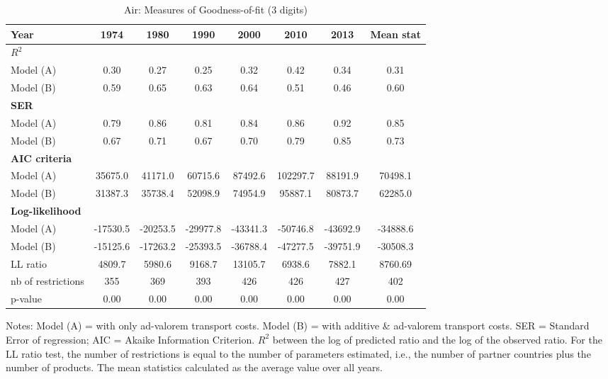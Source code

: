 \documentclass[a4paper,11pt]{article}
\begin{document}
\begin{table}[htbp]
  \centering
  \caption{Air: Measures of Goodness-of-fit (3 digits)}
  \footnotesize{
\begin{center}
    \begin{tabular}{l|cccccc|c}
    \hline \hline
    Year  & 1974  & 1980  & 1990  & 2000  & \multicolumn{1}{c}{2010} & \multicolumn{1}{c}{2013} & Mean stat \\ \hline
    \multicolumn{8}{l}{\bf{$R^2$} }\\ \hline
    Model (A)& 0.30  & 0.27  & 0.25  & 0.32  & \multicolumn{1}{c}{0.42} & \multicolumn{1}{c}{0.34} & 0.31 \\
    Model (B) & 0.59  & 0.65  & 0.63  & 0.64  & \multicolumn{1}{c}{0.51} & \multicolumn{1}{c}{0.46} & 0.60 \\ \hline
    \multicolumn{8}{l}{\textbf{SER}  }  \\ \hline
     Model (A) & 0.79  & 0.86  & 0.81  & 0.84  & \multicolumn{1}{c}{0.86} & \multicolumn{1}{c}{0.92} & 0.85 \\
    Model (B) & 0.67  & 0.71  & 0.67  & 0.70  & \multicolumn{1}{c}{0.79} & \multicolumn{1}{c}{0.85} & 0.73 \\ \hline
   \multicolumn{8}{l}{\textbf{AIC criteria}}  \\ \hline
    Model (A) & 35675.0 & 41171.0 & 60715.6 & 87492.6 & \multicolumn{1}{c}{102297.7} & \multicolumn{1}{c}{88191.9} & 70498.1 \\
    Model (B)  & 31387.3 & 35738.4 & 52098.9 & 74954.9 & \multicolumn{1}{c}{95887.1} & \multicolumn{1}{c}{80873.7} & 62285.0 \\ \hline
    \multicolumn{8}{l}{\textbf{Log-likelihood}} \\ \hline
    Model (A) & -17530.5 & -20253.5 & -29977.8 & -43341.3 & \multicolumn{1}{c}{-50746.8} & \multicolumn{1}{c}{-43692.9} & -34888.6 \\
    Model (B) & -15125.6 & -17263.2 & -25393.5 & -36788.4 & \multicolumn{1}{c}{-47277.5} & \multicolumn{1}{c}{-39751.9} & -30508.3 \\
    LL ratio & 4809.7 & 5980.6 & 9168.7 & 13105.7 & \multicolumn{1}{c}{6938.6} & \multicolumn{1}{c}{7882.1} & 8760.69 \\
    nb of restrictions & 355   & 369   & 393   & 426   & \multicolumn{1}{c}{426} & \multicolumn{1}{c}{427} & 402 \\
    p-value & 0.00 & 0.00 & 0.00 & 0.00 & \multicolumn{1}{c}{0.00} & \multicolumn{1}{c}{0.00} & 0.00 \\
    \hline \hline
 \end{tabular}%
    \end{center}}
  \label{tab:good_fit_air}%
 \parbox[l]{12cm}{\tiny{Notes: Model (A) = with only ad-valorem transport costs. Model (B) = with additive \& ad-valorem transport costs. SER = Standard Error of regression; AIC = Akaike Information Criterion. $R^{2}$ between the log of predicted ratio and the log of the observed ratio. For the LL ratio test, the number of restrictions is equal to the number of parameters estimated, i.e., the number of partner countries plus the number of products. The mean statistics calculated as the average value over all years. }}
\end{table}%
\end{document}
